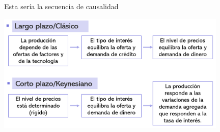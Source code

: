 \documentclass{beamer}
\begin{document}
\begin{frame}{Esta sería la secuencia de causalidad}

\centering\includegraphics[width=11cm]{../Figures/P18.png}\

\end{frame}
\end{document}
